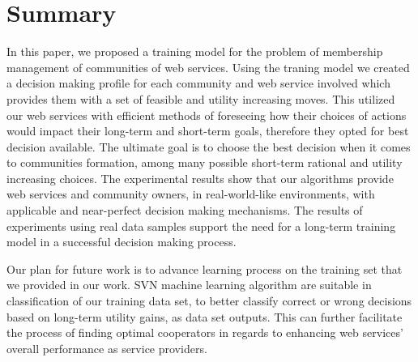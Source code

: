\section{Summary}\label{sec:conclusion-cha4}

In this paper, we proposed a training model for the problem of membership management of communities of web services. Using the traning model we created a decision making profile for each community and web service involved which provides them with a set of feasible and utility increasing moves. This utilized our web services with efficient methods of foreseeing how their choices of actions would impact their long-term and short-term goals, therefore they opted for best decision available. The ultimate goal is to choose the best decision when it comes to communities formation, among many possible short-term rational and utility increasing choices. The experimental results show that our algorithms provide web services and community owners, in real-world-like environments, with applicable and near-perfect decision making mechanisms. The results of experiments using real data samples support the need for a long-term training model in a successful decision making process.

Our plan for future work is to advance learning process on the training set that we provided in our work. SVN machine learning algorithm are suitable in classification of our training data set, to better classify correct or wrong decisions based on long-term utility gains, as data set outputs. This can further facilitate the process of finding optimal cooperators in regards to enhancing web services' overall performance as service providers.
